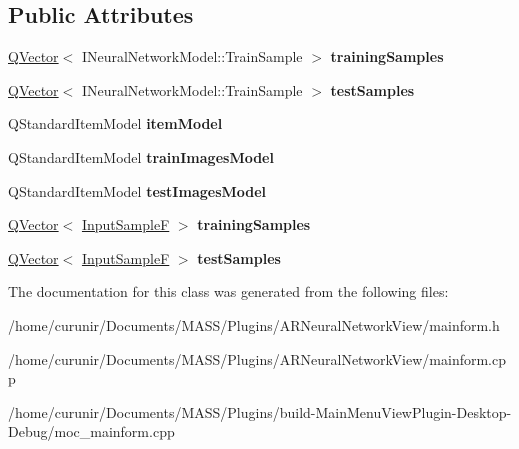 \subsection*{Public Attributes}
\begin{DoxyCompactItemize}
\item 
\hyperlink{class_q_vector}{Q\+Vector}$<$ I\+Neural\+Network\+Model\+::\+Train\+Sample $>$ {\bfseries training\+Samples}\hypertarget{class_main_form_ae3827327ab01288622f789ffd9a061d9}{}\label{class_main_form_ae3827327ab01288622f789ffd9a061d9}

\item 
\hyperlink{class_q_vector}{Q\+Vector}$<$ I\+Neural\+Network\+Model\+::\+Train\+Sample $>$ {\bfseries test\+Samples}\hypertarget{class_main_form_a869b2038409b2ba9fad616af593a97a3}{}\label{class_main_form_a869b2038409b2ba9fad616af593a97a3}

\item 
Q\+Standard\+Item\+Model {\bfseries item\+Model}\hypertarget{class_main_form_a7786cdf045d6037668f86b6db1277ba3}{}\label{class_main_form_a7786cdf045d6037668f86b6db1277ba3}

\item 
Q\+Standard\+Item\+Model {\bfseries train\+Images\+Model}\hypertarget{class_main_form_af5cdf86f72c4e89d8038b1594078b2a3}{}\label{class_main_form_af5cdf86f72c4e89d8038b1594078b2a3}

\item 
Q\+Standard\+Item\+Model {\bfseries test\+Images\+Model}\hypertarget{class_main_form_afcb8254310b51c1fd58c3852a6f063fa}{}\label{class_main_form_afcb8254310b51c1fd58c3852a6f063fa}

\item 
\hyperlink{class_q_vector}{Q\+Vector}$<$ \hyperlink{class_q_pair}{Input\+SampleF} $>$ {\bfseries training\+Samples}\hypertarget{class_main_form_a52b405f679729e32653e468a14aec648}{}\label{class_main_form_a52b405f679729e32653e468a14aec648}

\item 
\hyperlink{class_q_vector}{Q\+Vector}$<$ \hyperlink{class_q_pair}{Input\+SampleF} $>$ {\bfseries test\+Samples}\hypertarget{class_main_form_a04762603238b7eace528239e5354a632}{}\label{class_main_form_a04762603238b7eace528239e5354a632}

\end{DoxyCompactItemize}


The documentation for this class was generated from the following files\+:\begin{DoxyCompactItemize}
\item 
/home/curunir/\+Documents/\+M\+A\+S\+S/\+Plugins/\+A\+R\+Neural\+Network\+View/mainform.\+h\item 
/home/curunir/\+Documents/\+M\+A\+S\+S/\+Plugins/\+A\+R\+Neural\+Network\+View/mainform.\+cpp\item 
/home/curunir/\+Documents/\+M\+A\+S\+S/\+Plugins/build-\/\+Main\+Menu\+View\+Plugin-\/\+Desktop-\/\+Debug/moc\+\_\+mainform.\+cpp\end{DoxyCompactItemize}
